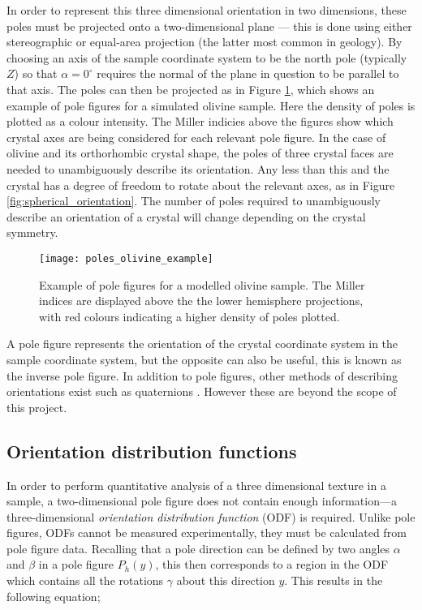 \documentclass[a4paper,12pt,twoside]{report}
\numberwithin{equation}{chapter}
\begin{document}
In order to represent this three dimensional orientation in two dimensions, these poles must be projected onto a two-dimensional plane --- this is done using either stereographic or equal-area projection (the latter most common in geology). By choosing an axis of the sample coordinate system to be the north pole (typically $Z$) so that $\alpha = 0^\circ$ requires the normal of the plane in question to be parallel to that axis. The poles can then be projected as in Figure \ref{fig:pole_olivine_example}, which shows an example of pole figures for a simulated olivine sample. Here the density of poles is plotted as a colour intensity. The Miller indicies above the figures show which crystal axes are being considered for each relevant pole figure. In the case of olivine and its orthorhombic crystal shape, the poles of three crystal faces are needed to unambiguously describe its orientation. Any less than this and the crystal has a degree of freedom to rotate about the relevant axes, as in Figure \ref{fig:spherical_orientation}. The number of poles required to unambiguously describe an orientation of a crystal will change depending on the crystal symmetry.




\begin{figure}[h]
  \centering
    \texttt{[image: poles\_olivine\_example]}
  \caption[Pole figure olivine example]{Example of pole figures for a modelled olivine sample. The Miller indices are displayed above the the lower hemisphere projections, with red colours indicating a higher density of poles plotted.}
  \label{fig:pole_olivine_example}
\end{figure}

A pole figure represents the orientation of the crystal coordinate system in the sample coordinate system, but the opposite can also be useful, this is known as the inverse pole figure. In addition to pole figures, other methods of describing orientations exist such as quaternions \citep{Quaternions}. However these are beyond the scope of this project. 

\subsection{Orientation distribution functions} \label{subsec:ODFs}
In order to perform quantitative analysis of a three dimensional texture in a sample, a two-dimensional pole figure does not contain enough information---a three-dimensional \emph{orientation distribution function} (ODF) is required. Unlike pole figures, ODFs cannot be measured experimentally, they must be calculated from pole figure data. Recalling that a pole direction can be defined by two angles $\alpha$ and $\beta$ in a pole figure $P_h(y)$, this then corresponds to a region in the ODF which contains all the rotations $\gamma$ about this direction $y$. This results in the following equation;
\end{document}
